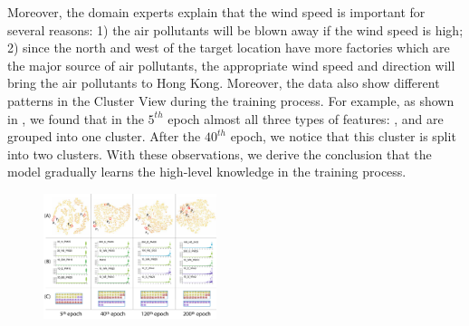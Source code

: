 Moreover, the domain experts explain that the wind speed is important for several reasons: 1) the air pollutants will  be blown away if the wind speed is high; 2) since the north and west of the target location have more factories which are the major source of air pollutants, the appropriate wind speed and direction will bring the air pollutants to Hong Kong.
Moreover, the data also show different patterns in the Cluster View during the training process. 
For example, as shown in , we found that in the $5^{th}$ epoch almost all three types of features: \textit{\color{SLPColor}{Sealevel Pressure}}, \textit{\color{DPColor}{Dew-point}} and  \textit{\color{SPColor}{Station Pressure}} are grouped into one cluster. 
After the $40^{th}$ epoch, we notice that this cluster is split into two clusters.
With these observations, we derive the conclusion that the model gradually learns the high-level knowledge in the training process.

\begin{figure}[t]
	\centering
	\includegraphics[width=0.45\textwidth]{pictures/Evaluation/evolution_epochs.pdf}
	\vspace{-3mm}
	\caption{
	}
	\label{fig:evolution_epochs}
	\vspace{-4mm}
\end{figure}

